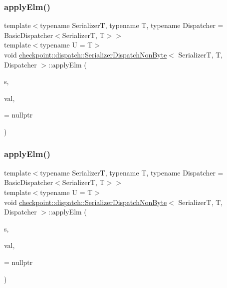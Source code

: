 \subsubsection{\texorpdfstring{apply\+Elm()}{applyElm()}\hspace{0.1cm}{\footnotesize\ttfamily [2/3]}}
{\footnotesize\ttfamily template$<$typename SerializerT, typename T, typename Dispatcher = Basic\+Dispatcher$<$\+Serializer\+T, T$>$$>$ \\
template$<$typename U  = T$>$ \\
void \hyperlink{structcheckpoint_1_1dispatch_1_1_serializer_dispatch_non_byte}{checkpoint\+::dispatch\+::\+Serializer\+Dispatch\+Non\+Byte}$<$ SerializerT, T, Dispatcher $>$\+::apply\+Elm (\begin{DoxyParamCaption}\item[{SerializerT \&}]{s,  }\item[{T $\ast$}]{val,  }\item[{has\+Not\+Split\+Serialize$<$ U $>$ $\ast$}]{ = {\ttfamily nullptr} }\end{DoxyParamCaption})\hspace{0.3cm}{\ttfamily [inline]}}

\mbox{\label{structcheckpoint_1_1dispatch_1_1_serializer_dispatch_non_byte_a7cd7decd9c65f3f5d68a2e593275f8d1}} 
\subsubsection{\texorpdfstring{apply\+Elm()}{applyElm()}\hspace{0.1cm}{\footnotesize\ttfamily [3/3]}}
{\footnotesize\ttfamily template$<$typename SerializerT, typename T, typename Dispatcher = Basic\+Dispatcher$<$\+Serializer\+T, T$>$$>$ \\
template$<$typename U  = T$>$ \\
void \hyperlink{structcheckpoint_1_1dispatch_1_1_serializer_dispatch_non_byte}{checkpoint\+::dispatch\+::\+Serializer\+Dispatch\+Non\+Byte}$<$ SerializerT, T, Dispatcher $>$\+::apply\+Elm (\begin{DoxyParamCaption}\item[{SerializerT \&}]{s,  }\item[{T $\ast$}]{val,  }\item[{is\+Enum$<$ U $>$ $\ast$}]{ = {\ttfamily nullptr} }\end{DoxyParamCaption})\hspace{0.3cm}{\ttfamily [inline]}}

